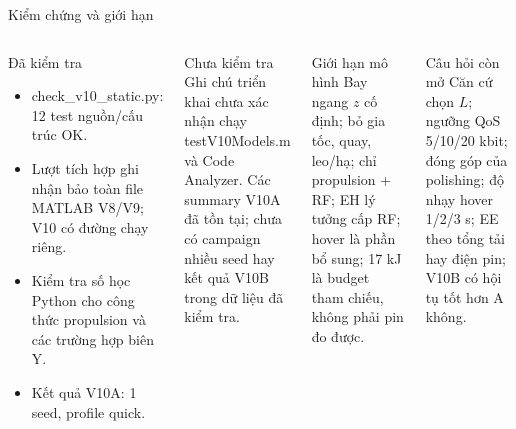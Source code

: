 \documentclass[t,aspectratio=169]{beamer}
\newcommand{\code}[1]{{\small\ttfamily #1}}
\begin{document}
\begin{frame}{Kiểm chứng và giới hạn}
  \begin{columns}[T]
  \begin{block}{Đã kiểm tra}\scriptsize
  \begin{itemize}
    \item \code{check\_v10\_static.py}: 12 test nguồn/cấu trúc OK.
    \item Lượt tích hợp ghi nhận bảo toàn file MATLAB V8/V9; V10 có đường chạy riêng.
    \item Kiểm tra số học Python cho công thức propulsion và các trường hợp biên Y.
    \item Kết quả V10A: 1 seed, profile quick.
  \end{itemize}
  \end{block}
  \begin{alertblock}{Chưa kiểm tra}\scriptsize
  Ghi chú triển khai chưa xác nhận chạy \code{testV10Models.m} và Code Analyzer. Các summary V10A đã tồn tại; chưa có campaign nhiều seed hay kết quả V10B trong dữ liệu đã kiểm tra.
  \end{alertblock}
  \begin{block}{Giới hạn mô hình}\scriptsize
  Bay ngang $z$ cố định; bỏ gia tốc, quay, leo/hạ; chỉ propulsion + RF; EH lý tưởng cấp RF; hover là phần bổ sung; 17 kJ là budget tham chiếu, không phải pin đo được.
  \end{block}
  \begin{block}{Câu hỏi còn mở}\scriptsize
  Căn cứ chọn $L$; ngưỡng QoS 5/10/20 kbit; đóng góp của polishing; độ nhạy hover 1/2/3 s; EE theo tổng tải hay điện pin; V10B có hội tụ tốt hơn A không.
  \end{block}
  \end{columns}
\end{frame}
\end{document}
